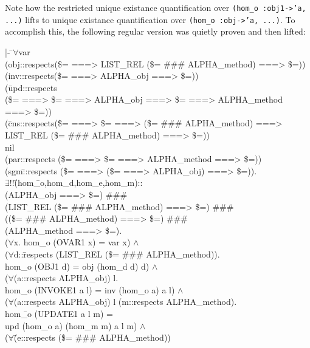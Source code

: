 \documentclass[envcountsame,runningheads]{llncs}
\begin{document}
\noindent
Note how the restricted unique existance quantification
over {\tt (hom\_o :obj1->'a,
...)}
lifts to unique existance quantification over {\tt (hom\_o :obj->'a,
...)}.
To accomplish this,
the following regular version was quietly proven and then lifted:
{\tt \begin{tabbing}
|- \=$\forall$var \\
\> (obj::respects(\$= ===> LIST\_REL (\$= \#\#\# ALPHA\_method) ===> \$=)) \\
\> (inv::respects(\$= ===> ALPHA\_obj ===> \$=)) \\
\> (\=upd::respects \\
\>\>(\$= ===> \$= ===> ALPHA\_obj ===> \$= ===> ALPHA\_method ===> \$=)) \\
\> (\=cns::respects(\=\$= ===> \$= ===> (\$= \#\#\# ALPHA\_method) ===> \\
\>\>\>            LIST\_REL (\$= \#\#\# ALPHA\_method) ===> \$=)) \\
\>\>nil \\
\> (par::respects (\$= ===> \$= ===> ALPHA\_method ===> \$=)) \\
\> (sgm\=::respects (\$= ===> (\$= ===> ALPHA\_obj) ===> \$=)). \\
\>\> $\exists !!$\=(hom\=\_o,hom\_d,hom\_e,hom\_m):: \\
\>\>\>\>  (ALPHA\_obj ===> \$=) \#\#\# \\
\>\>\>\>  (LIST\_REL (\$= \#\#\# ALPHA\_method) ===> \$=) \#\#\# \\
\>\>\>\>  ((\$= \#\#\# ALPHA\_method) ===> \$=) \#\#\# \\
\>\>\>\>  (ALPHA\_method ===> \$=). \\
\>\>\>($\forall$x. hom\_o (OVAR1 x) = var x) $\wedge$ \\
\>\>\>($\forall$d::\=respects (LIST\_REL (\$= \#\#\# ALPHA\_method)). \\
\>\>\>\>   hom\_o (OBJ1 d) = obj (hom\_d d) d) $\wedge$ \\
\>\>\>($\forall$(a::respects ALPHA\_obj) l. \\
\>\>\>\>   hom\_o (INVOKE1 a l) = inv (hom\_o a) a l) $\wedge$ \\
\>\>\>($\forall$(a::respects ALPHA\_obj) l (m::respects ALPHA\_method). \\
\>\>\>\>   hom\=\_o (UPDATE1 a l m) = \\
\>\>\>\>\>    upd (hom\_o a) (hom\_m m) a l m) $\wedge$ \\
\>\>\>($\forall$\=(e::respects (\$= \#\#\# ALPHA\_method)) \\

\end{tabbing}}
\end{document}
